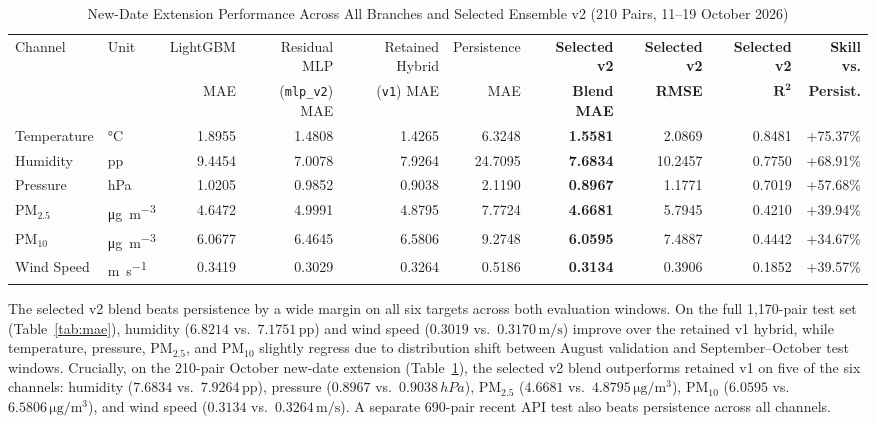 \documentclass[journal,a4paper]{IEEEtran}
\begin{document}
\begin{table}[!t]
\caption{New-Date Extension Performance Across All Branches and Selected Ensemble v2 (210 Pairs, 11--19 October 2026)}
\label{tab:extension}
\centering
\footnotesize
\setlength{\tabcolsep}{5.5pt}
\begin{tabular}{@{}llrrrrrrrr@{}}
\toprule
Channel & Unit & LightGBM & Residual MLP & Retained Hybrid & Persistence & \textbf{Selected v2} & \textbf{Selected v2} & \textbf{Selected v2} & \textbf{Skill vs.} \\
        &      & MAE      & (\texttt{mlp\_v2}) MAE & (\texttt{v1}) MAE & MAE         & \textbf{Blend MAE}   & \textbf{RMSE}        & $\boldsymbol{R^2}$   & \textbf{Persist.} \\
\midrule
Temperature & \si{\celsius}                    & 1.8955 & 1.4808 & 1.4265 & 6.3248 & \textbf{1.5581} & 2.0869 & 0.8481 & +75.37\% \\
Humidity    & pp                               & 9.4454 & 7.0078 & 7.9264 & 24.7095 & \textbf{7.6834} & 10.2457 & 0.7750 & +68.91\% \\
Pressure    & \si{hPa}                         & 1.0205 & 0.9852 & 0.9038 & 2.1190 & \textbf{0.8967} & 1.1771 & 0.7019 & +57.68\% \\
PM$_{2.5}$  & \si{\micro\gram\per\cubic\metre} & 4.6472 & 4.9991 & 4.8795 & 7.7724 & \textbf{4.6681} & 5.7945 & 0.4210 & +39.94\% \\
PM$_{10}$   & \si{\micro\gram\per\cubic\metre} & 6.0677 & 6.4645 & 6.5806 & 9.2748 & \textbf{6.0595} & 7.4887 & 0.4442 & +34.67\% \\
Wind Speed  & \si{\metre\per\second}           & 0.3419 & 0.3029 & 0.3264 & 0.5186 & \textbf{0.3134} & 0.3906 & 0.1852 & +39.57\% \\
\bottomrule
\end{tabular}
\end{table}

The selected v2 blend beats persistence by a wide margin on all six targets across both evaluation windows. On the full 1{,}170-pair test set (Table~\ref{tab:mae}), humidity ($6.8214$ vs.\ $7.1751\,\text{pp}$) and wind speed ($0.3019$ vs.\ $0.3170\,\si{\metre\per\second}$) improve over the retained v1 hybrid, while temperature, pressure, PM$_{2.5}$, and PM$_{10}$ slightly regress due to distribution shift between August validation and September--October test windows. Crucially, on the 210-pair October new-date extension (Table~\ref{tab:extension}), the selected v2 blend outperforms retained v1 on five of the six channels: humidity ($7.6834$ vs.\ $7.9264\,\text{pp}$), pressure ($0.8967$ vs.\ $0.9038\,\si{hPa}$), PM$_{2.5}$ ($4.6681$ vs.\ $4.8795\,\si{\micro\gram\per\cubic\metre}$), PM$_{10}$ ($6.0595$ vs.\ $6.5806\,\si{\micro\gram\per\cubic\metre}$), and wind speed ($0.3134$ vs.\ $0.3264\,\si{\metre\per\second}$). A separate 690-pair recent API test also beats persistence across all channels.
\end{document}
